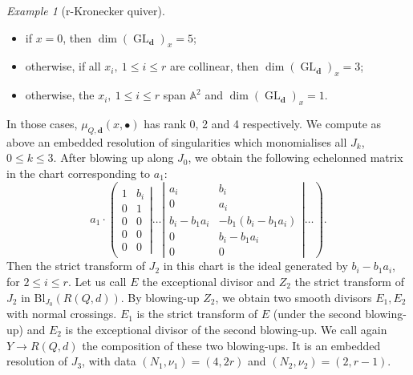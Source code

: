 \documentclass[11pt,english]{article}
\numberwithin{equation}{section}
\numberwithin{figure}{section}
\theoremstyle{definition}
\theoremstyle{plain}
\theoremstyle{remark}
\newtheorem{exmp}[df]{Example}
\DeclareMathOperator{\GL}{GL}
\newcommand\dd{\mathbf{d}}
\begin{document}
\begin{exmp}[r-Kronecker quiver]
\begin{itemize}
\item if $x=0$, then $\dim(\GL_{\dd})_{x}=5$;
\item otherwise, if all $x_{i},\ 1\leq i\leq r$ are collinear, then $\dim(\GL_{\dd})_{x}=3$;
\item otherwise, the $x_{i},\ 1\leq i\leq r$ span $\mathbb{A}^{2}$ and
$\dim(\GL_{\dd})_{x}=1$.
\end{itemize}
In those cases, $\mu_{Q,\dd}(x,\bullet)$ has rank 0, 2 and 4 respectively.
We compute as above an embedded resolution of singularities which
monomialises all $J_{k}$, $0\leq k\leq3$. After blowing up along
$J_{0}$, we obtain the following echelonned matrix in the chart corresponding
to $a_{1}$:\[
a_1\cdot
\left(
\left.
\begin{array}{cc}
1 & b_i \\
0 & 1 \\
0 & 0 \\
0 & 0 \\
0 & 0
\end{array}
\right\vert
\ldots
\left\vert
\begin{array}{cc}
a_i & b_i \\
0 & a_i \\
b_i-b_1a_i & -b_1(b_i-b_1a_i) \\
0 & b_i-b_1a_i \\
0 & 0
\end{array}
\right\vert
\ldots
\right)
.
\]Then the strict transform of $J_{2}$ in this chart is the ideal generated
by $b_{i}-b_{1}a_{i}$, for $2\leq i\leq r$. Let us call $E$ the
exceptional divisor and $Z_{2}$ the strict transform of $J_{2}$
in $\mathrm{Bl}_{J_{0}}(R(Q,d))$. By blowing-up $Z_{2}$, we obtain
two smooth divisors $E_{1},E_{2}$ with normal crossings. $E_{1}$
is the strict transform of $E$ (under the second blowing-up) and
$E_{2}$ is the exceptional divisor of the second blowing-up. We call
again $Y\rightarrow R(Q,d)$ the composition of these two blowing-ups.
It is an embedded resolution of $J_{3}$, with data $(N_{1},\nu_{1})=(4,2r)$
and $(N_{2},\nu_{2})=(2,r-1)$.


\end{exmp}
\end{document}
